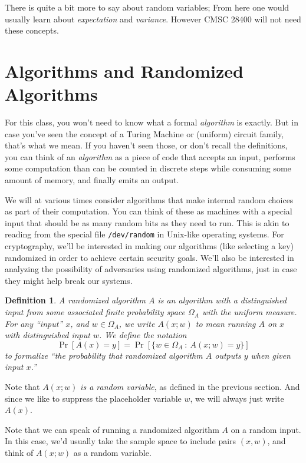 \documentclass[11pt]{article}
\newtheorem{definition}{Definition}
\begin{document}
There is quite a bit more to say about random variables; From here one would
usually learn about \emph{expectation} and \emph{variance}. However CMSC
28400 will not need these concepts.


\section{Algorithms and Randomized Algorithms}

For this class, you won't need to know what a formal \emph{algorithm} is
exactly. But in case you've seen the concept of a Turing Machine or 
(uniform) circuit family, that's what we mean. If you haven't seen those, or
don't recall the definitions, you can think of an \emph{algorithm} as
a piece of code that accepts an input, performs some computation than
can be counted in discrete steps while consuming some amount of memory,
and finally emits an output. 

We will at various times consider algorithms that make internal random choices
as part of their computation. You can think of these as machines with a special
input that should be as many random bits as they need to run. This is akin to
reading from the special file \texttt{/dev/random} in Unix-like operating
systems. For cryptography, we'll be interested in making our algorithms (like
selecting a key) randomized in order to achieve certain security goals.  We'll
also be interested in analyzing the possibility of adversaries using randomized
algorithms, just in case they might help break our systems.

\begin{definition}
    A \emph{randomized algorithm $A$} is an algorithm with a distinguished
    input from some associated finite probability space $\Omega_A$ with the
    uniform measure.  For any ``input'' $x$, and $w\in\Omega_A$, we write 
    $A(x;w)$ to mean running $A$ on $x$ with distinguished input $w$.
    We define the notation
    \[
        \Pr[A(x) = y] = \Pr[\{w\in\Omega_A \ : \ A(x;w)=y\}]
    \]
    to formalize ``the probability that randomized algorithm $A$ outputs $y$
    when given input $x$.''
\end{definition}
Note that $A(x;w)$ \emph{is a random variable}, as defined in the previous
section.  And since we like to suppress the placeholder variable $w$, we will
always just write $A(x)$.

Note that we can speak of running a randomized algorithm $A$ on a random
input. In this case, we'd usually take the sample space to include pairs
$(x,w)$, and think of $A(x;w)$ as a random variable.
\end{document}
